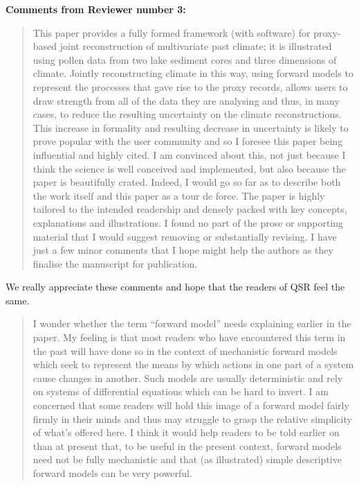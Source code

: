 \documentclass[a4paper,11pt]{article}
\begin{document}
\pagebreak

\textbf{Comments from Reviewer number 3:}
\begin{framed} \begin{quote}
This paper provides a fully formed framework (with software) for proxy-based joint reconstruction of multivariate past climate; it is illustrated using pollen data from two lake sediment cores and three dimensions of climate.  Jointly reconstructing climate in this way, using forward models to represent the processes that gave rise to the proxy records, allows users to draw strength from all of the data they are analysing and thus, in many cases, to reduce the resulting uncertainty on the climate reconstructions.  This increase in formality and resulting decrease in uncertainty is likely to prove popular with the user community and so I foresee this paper being influential and highly cited.  I am convinced about this, not just because I think the science is well conceived and implemented, but also because the paper is beautifully crated.  Indeed, I would go so far as to describe both the work itself and this paper as a tour de force.  The paper is highly tailored to the intended readership and densely packed with key concepts, explanations and illustrations.  I found no part of the prose or supporting material that I would suggest removing or substantially revising.  I have just a few minor comments that I hope might help the authors as they finalise the manuscript for publication.
\end{quote} \end{framed}
We really appreciate these comments and hope that the readers of QSR feel the same.

\begin{framed} \begin{quote}
I wonder whether the term ``forward model'' needs explaining earlier in the paper.  My feeling is that most readers who have encountered this term in the past will have done so in the context of mechanistic forward models which seek to represent the means by which actions in one part of a system cause changes in another.  Such models are usually deterministic and rely on systems of differential equations which can be hard to invert.  I am concerned that some readers will hold this image of a forward model fairly firmly in their minds and thus may struggle to grasp the relative simplicity of what's offered here.  I think it would help readers to be told earlier on than at present that, to be useful in the present context, forward models need not be fully mechanistic and that (as illustrated) simple descriptive forward models can be very powerful.
\end{quote} \end{framed}
\end{document}

